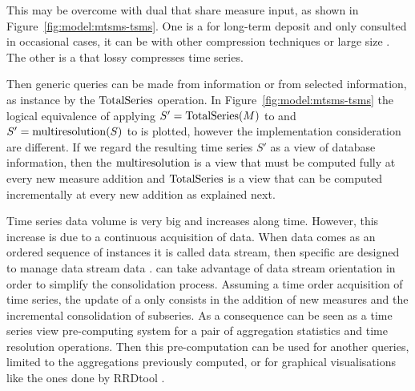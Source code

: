 This may be overcome with dual  that share measure input,
as shown in Figure~\ref{fig:model:mtsms-tsms}. One is a 
for long-term deposit and only consulted in occasional cases, it can
be  with other compression techniques or large size
. The other is a  that lossy compresses time
series.

Then generic queries can be made from  information or from
 selected information, as instance by the $\operatorname{TotalSeries}$
operation. In Figure~\ref{fig:model:mtsms-tsms} the logical
equivalence of applying $S'=\operatorname{TotalSeries}(M)$ to  and
$S'=\operatorname{multiresolution}(S)$ to  is plotted, however the
implementation consideration are different. If we regard the resulting
time series $S'$ as a view of database information, then the
$\operatorname{multiresolution}$ is a view that must be computed fully at every new
measure addition and $\operatorname{TotalSeries}$ is a view that can be computed
incrementally at every new addition as explained next.


Time series data volume is very big and increases along time. However,
this increase is due to a continuous acquisition of data. When data
comes as an ordered sequence of instances it is called data stream,
then specific  are designed to manage data stream data
\cite{stonebraker05:sigmod}.   can take advantage of data
stream orientation in order to simplify the consolidation process.
Assuming a time order acquisition of time series, the update of a
 only consists in the addition of new measures and the
incremental consolidation of subseries.  As a consequence 
can be seen as a time series view pre-computing system for a pair of
aggregation statistics and time resolution operations.  Then this
pre-computation can be used for another queries, limited to the
aggregations previously computed, or for graphical visualisations like
the ones done by RRDtool \cite{rrdtool}.







